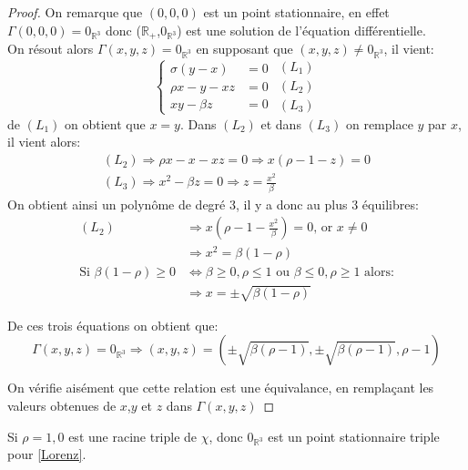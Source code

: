 \documentclass{article}
\newcommand{\R}{\mathbb{R}}
\newtheorem[M , nocut]{prop}{Proposition}[section]
\newtheorem[M , nocut]{definition}{Définition}
\newtheorem[M , nocut]{lemme}{Lemme}
\newtheorem[L , nocut]{thm}{Théoreme}
\newtheorem[M , nocut]{cor}{Corollaire}
\begin{document}
\begin{proof}
On remarque que $(0,0,0)$ est un point stationnaire, en effet $\Gamma(0,0,0) = 0_{\R^3}$ donc ($\R_+$,$0_{\R^3}$) est une solution de l'équation différentielle.\\
On résout alors $\Gamma(x,y,z)=0_{\R^3}$ en supposant que $(x,y,z) \neq 0_{\R^3}$, il vient:
\[
\left\{\begin{array}{rl} %
     \sigma(y-x)&=0  \\
     \rho x -y -xz&=0\\
     xy - \beta z&=0
\end{array}\right.
\begin{array}{c} %
    (L_1)\\
    (L_2)\\
    (L_3)
\end{array}
\]
de $(L_1)$ on obtient que $x=y$. Dans $(L_2)$ et dans $(L_3)$ on remplace $y$ par $x$, il vient alors:
\begin{gather*}
    (L_2) \Rightarrow \rho x - x - xz = 0 \Rightarrow x (\rho -1 -z ) = 0 \\
    (L_3) \Rightarrow x^2 - \beta z = 0 \Rightarrow z = \frac{x^2}{\beta}
\end{gather*}
On obtient ainsi un polynôme de degré 3, il y a donc au plus 3 équilibres:
\begin{align*}
    (L_2) & \Rightarrow x (\rho - 1 - \frac{x^2}{\beta}) = 0 \text{, or }x \neq 0\\
        & \Rightarrow x^2 = \beta (1-\rho)\\
    \text{Si } \beta(1-\rho) \ge 0 & \Leftrightarrow \beta \ge 0,\rho\le 1 \text{ ou } \beta \le 0,\rho\ge 1\text{ alors:}\\
    &\Rightarrow x = \pm \sqrt{\beta(1-\rho)}
\end{align*}

De ces trois équations on obtient que:
\[
    \Gamma(x,y,z)=0_{\R^3} \Rightarrow (x,y,z) = (\pm \sqrt{ \beta (\rho -1)} ,\pm \sqrt{\beta (\rho -1)}, \rho -1)
\]

On vérifie aisément que cette relation est une \'equivalance, en remplaçant les valeurs obtenues de $x$,$y$ et $z$ dans $\Gamma(x,y,z)$
\end{proof}

\begin{example}[Remarque]
    Si $\rho=1, 0$ est une racine triple de $\chi$, donc $0_{\R^3}$ est un point stationnaire triple pour \eqref{Lorenz}.
\end{example}
\end{document}
